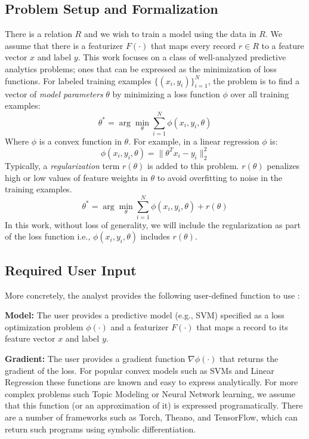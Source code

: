 \subsection{Problem Setup and Formalization}
There is a relation $R$ and we wish to train a model using the data in $R$.
We assume that there is a featurizer $F(\cdot)$ that maps every record $r \in R$ to a feature vector $x$ and label $y$.
This work focuses on a class of well-analyzed predictive analytics problems; ones that can be expressed as the minimization of loss functions.
For labeled training examples $\{(x_{i},y_{i})\}_{i=1}^{N}$, the problem is to find a vector of \emph{model parameters} $\theta$ by minimizing a loss function $\phi$ over all training examples:
\[
 \theta^{*}=\arg\min_{\theta}\sum_{i=1}^{N}\phi(x_{i},y_{i},\theta)
\]
Where $\phi$ is a convex function in $\theta$.
For example, in a linear regression $\phi$ is:
\[
\phi(x_{i},y_{i},\theta) = \|\theta^Tx_{i} - y_i \|_2^2
\]
Typically, a \emph{regularization} term $r(\theta)$ is added to this problem.
$r(\theta)$ penalizes high or low values of feature weights in $\theta$ to avoid overfitting to noise in the training examples.
\begin{equation}
 \theta^{*}=\arg\min_{\theta}\sum_{i=1}^{N}\phi(x_{i},y_{i},\theta) + r(\theta)
 \label{ideal}
\end{equation}
In this work, without loss of generality, we will include the regularization as part of the loss function i.e., $\phi(x_{i},y_{i},\theta)$ includes $r(\theta)$.

\subsection{Required User Input}\label{uinp}
More concretely, the analyst provides the following user-defined function to use \sys:

\noindent\textbf{Model:} The user provides a predictive model (e.g., SVM) specified as a loss optimization problem $\phi(\cdot)$ and a featurizer $F(\cdot)$ that maps a record to its feature vector $x$ and label $y$.

\vspace{0.25em}

\noindent\textbf{Gradient:} The user provides a gradient function $\nabla\phi(\cdot)$ that returns the gradient of the loss. For popular convex models such as SVMs and Linear Regression these functions are known and easy to express analytically. For more complex problems such Topic Modeling or Neural Network learning, we assume that this function (or an approximation of it) is expressed programatically. There are a number of frameworks such as Torch, Theano, and TensorFlow, which can return such programs using symbolic differentiation. 

